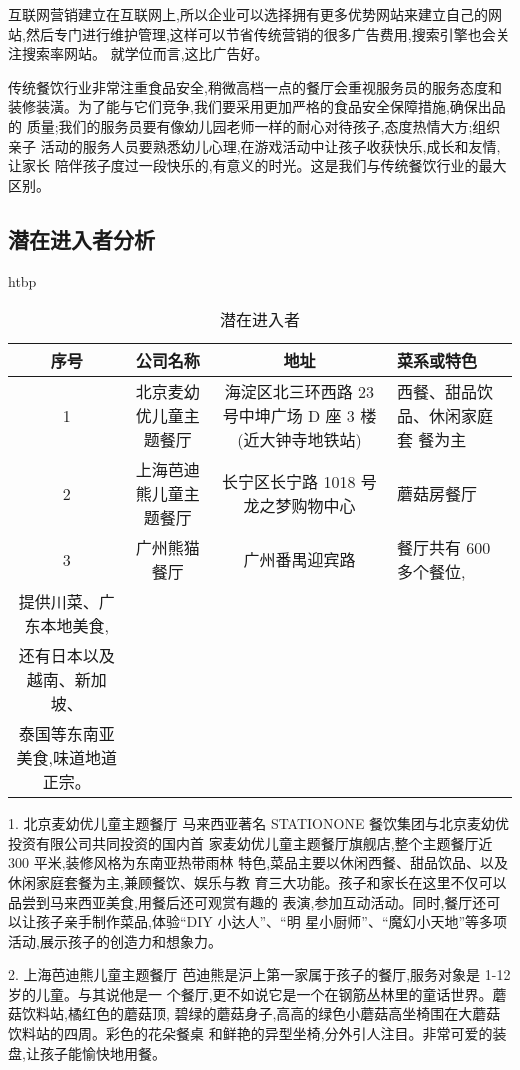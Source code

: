 互联网营销建立在互联网上,所以企业可以选择拥有更多优势网站来建立自己的网
站,然后专门进行维护管理,这样可以节省传统营销的很多广告费用,搜索引擎也会关
注搜索率网站。 就学位而言,这比广告好。

传统餐饮行业非常注重食品安全,稍微高档一点的餐厅会重视服务员的服务态度和
装修装潢。为了能与它们竞争,我们要采用更加严格的食品安全保障措施,确保出品的
质量;我们的服务员要有像幼儿园老师一样的耐心对待孩子,态度热情大方;组织亲子
活动的服务人员要熟悉幼儿心理,在游戏活动中让孩子收获快乐,成长和友情,让家长
陪伴孩子度过一段快乐的,有意义的时光。这是我们与传统餐饮行业的最大区别。

\subsection{潜在进入者分析}
\begin{table}{htbp}
\caption{潜在进入者}
\centering
\begin{tabular}{|c|c|c|p{5cm}|}
\hline
序号    &       公司名称        &       地址            &       菜系或特色\\ \hline
1       &北京麦幼优儿童主题餐厅 &海淀区北三环西路 23 号中坤广场 D 座 3 楼(近大钟寺地铁站) 
        &西餐、甜品饮品、休闲家庭套 餐为主\\ \hline
2       &上海芭迪熊儿童主题餐厅 &长宁区长宁路 1018 号龙之梦购物中心&蘑菇房餐厅\\ \hline
3       &广州熊猫餐厅&广州番禺迎宾路&餐厅共有 600 多个餐位,\\
        提供川菜、广东本地美食,\\还有日本以及越南、新加坡、\\泰国等东南亚美食,味道地道正宗。\\
        \hline
\end{tabular}
\end{table}
1. 北京麦幼优儿童主题餐厅
马来西亚著名 STATIONONE 餐饮集团与北京麦幼优投资有限公司共同投资的国内首
家麦幼优儿童主题餐厅旗舰店,整个主题餐厅近 300 平米,装修风格为东南亚热带雨林
特色,菜品主要以休闲西餐、甜品饮品、以及休闲家庭套餐为主,兼顾餐饮、娱乐与教
育三大功能。孩子和家长在这里不仅可以品尝到马来西亚美食,用餐后还可观赏有趣的
表演,参加互动活动。同时,餐厅还可以让孩子亲手制作菜品,体验“DIY 小达人”、“明
星小厨师”、“魔幻小天地”等多项活动,展示孩子的创造力和想象力。

2. 上海芭迪熊儿童主题餐厅
芭迪熊是沪上第一家属于孩子的餐厅,服务对象是 1-12 岁的儿童。与其说他是一
个餐厅,更不如说它是一个在钢筋丛林里的童话世界。蘑菇饮料站,橘红色的蘑菇顶,
碧绿的蘑菇身子,高高的绿色小蘑菇高坐椅围在大蘑菇饮料站的四周。彩色的花朵餐桌
和鲜艳的异型坐椅,分外引人注目。非常可爱的装盘,让孩子能愉快地用餐。

